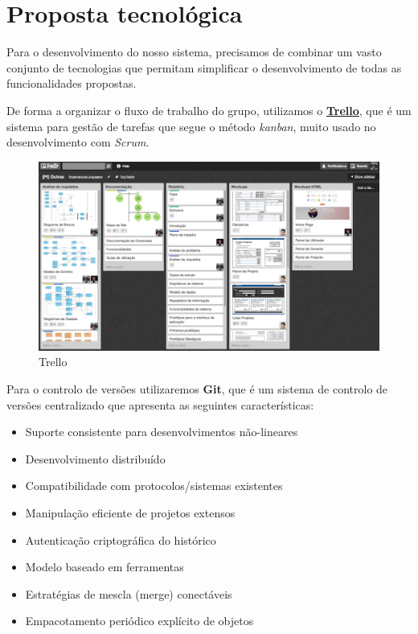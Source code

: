 \section{Proposta tecnológica}

Para o desenvolvimento do nosso sistema, precisamos de combinar um vasto conjunto de tecnologias que permitam 
simplificar o desenvolvimento de todas as funcionalidades propostas.

De forma a organizar o fluxo de trabalho do grupo, utilizamos o \href{https://trello.com/}{\textbf{Trello}}, 
que é um sistema para gestão de tarefas que segue o método \textit{kanban}, muito usado no desenvolvimento com \textit{Scrum}. 

\begin{figure}[H] 
  \centering
  \includegraphics[width=1\textwidth]{images/tecnologias/trello}
  \caption{Trello}
  \label{fig:trello}
\end{figure}

Para o controlo de versões utilizaremos \textbf{Git}, que é um sistema de controlo de versões 
centralizado que apresenta as seguintes características:

\begin{itemize}
  \item Suporte consistente para desenvolvimentos não-lineares
  \item Desenvolvimento distribuído
  \item Compatibilidade com protocolos/sistemas existentes
  \item Manipulação eficiente de projetos extensos  
  \item Autenticação criptográfica do histórico 
  \item Modelo baseado em ferramentas 
  \item Estratégias de mescla (merge) conectáveis
  \item Empacotamento periódico explícito de objetos  
\end{itemize}


